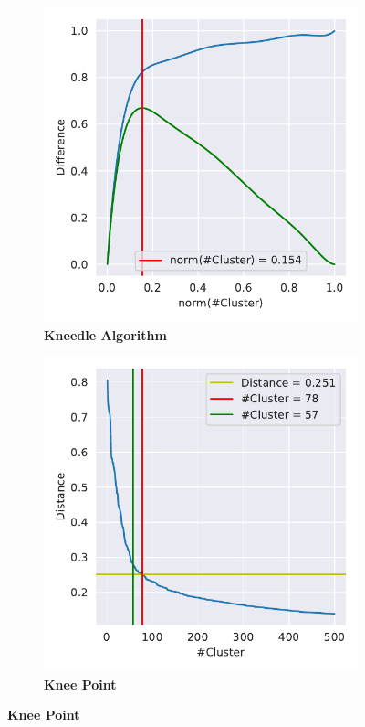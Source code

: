 \FloatBarrier
\newpage

\begin{figure}[!hbt]
    \centering
    \begin{subfigure}[b]{0.475\textwidth}
        \caption[Kneedle Algorithm]{\textbf{Kneedle Algorithm}}
        \label{subfig:Result_Cluster_Knee_Kneedle_4}            \includegraphics[width=\textwidth]{Results/Cluster_Knee_Segment_4.pdf}
    \end{subfigure}
    \hfill
    \begin{subfigure}[b]{0.475\textwidth}
        \caption[Kneedle point]{\textbf{Knee Point}}
        \label{subfig:Result_Cluster_Knee_Elbow_4}            \includegraphics[width=\textwidth]{Results/Cluster_Elbow_Knee_Segment_4.pdf}

\end{subfigure}
\end{figure}
